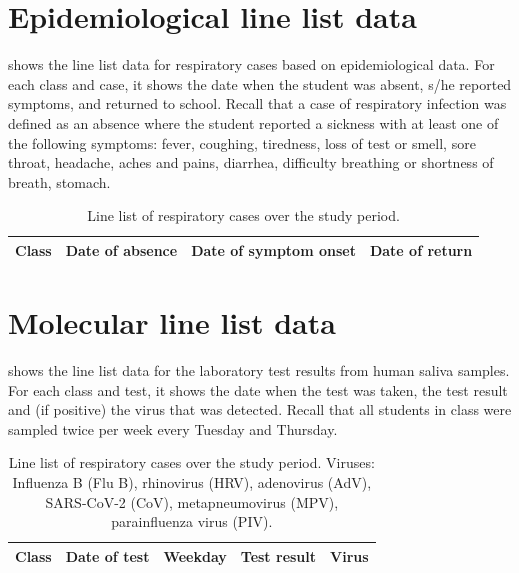 \documentclass[fleqn,11pt]{wlscirep_supp}
\begin{document}
\clearpage

\section{Epidemiological line list data}\label{sec:case-data}

 shows the line list data for respiratory cases based on epidemiological data. For each class and case, it shows the date when the student was absent, s/he reported symptoms, and returned to school. Recall that a case of respiratory infection was defined as an absence where the student reported a sickness with at least one of the following symptoms: fever, coughing, tiredness, loss of test or smell, sore throat, headache, aches and pains, diarrhea, difficulty breathing or shortness of breath, stomach.

{\footnotesize\begin{longtable}{l l l l}
    \caption[Line list of respiratory cases over the study period]{Line list of respiratory cases over the study period.}\label{tab:epi-data-line-list} \\
    \toprule
    Class & Date of absence & Date of symptom onset & Date of return \\
    \midrule
    
    \bottomrule
\end{longtable}}

\clearpage

\section{Molecular line list data}\label{sec:mol-data}

 shows the line list data for the laboratory test results from human saliva samples. For each class and test, it shows the date when the test was taken, the test result and (if positive) the virus that was detected. Recall that all students in class were sampled twice per week every Tuesday and Thursday. 

{\footnotesize\begin{longtable}{l l l l l}
    \caption[Line list of molecular test results over the study period]{Line list of respiratory cases over the study period. Viruses: Influenza B (Flu B), rhinovirus (HRV), adenovirus (AdV), SARS-CoV-2 (CoV), metapneumovirus (MPV), parainfluenza virus (PIV).}\label{tab:mol-data-line-list} \\
    \toprule
    Class & Date of test & Weekday & Test result & Virus \\
    \midrule
    
    \bottomrule
\end{longtable}}
\end{document}
